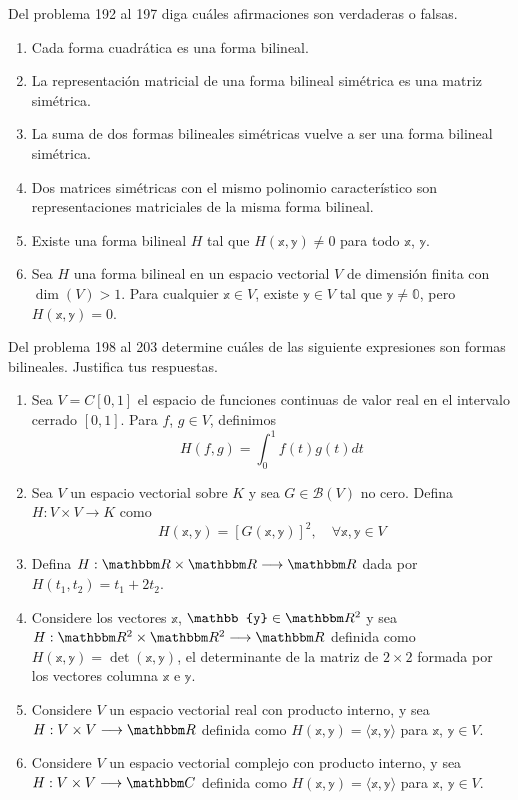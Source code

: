 Del problema 192 al 197 diga cuáles afirmaciones son verdaderas o falsas.
\begin{enumerate}[start=192]
    \item Cada forma cuadrática es una forma bilineal.
    \item La representación matricial de una forma bilineal simétrica es una matriz simétrica.
    \item La suma de dos formas bilineales simétricas vuelve a ser una forma bilineal simétrica.
    \item Dos matrices simétricas con el mismo polinomio característico son representaciones matriciales de la misma forma bilineal.
    \item Existe una forma bilineal $H$ tal que $H(\mathbb{x}, \mathbb{y}) \neq 0$ para todo $\mathbb{x}$, $\mathbb{y}$.
    \item Sea $H$ una forma bilineal en un espacio vectorial $V$ de dimensión finita con $\operatorname{dim}(V) > 1$. Para cualquier $\mathbb{x} \in V$, existe $\mathbb{y} \in V$ tal que $\mathbb{y} \neq \mathbb{0}$, pero $H(\mathbb{x}, \mathbb{y}) = 0$.
\end{enumerate}
Del problema 198 al 203 determine cuáles de las siguiente expresiones son formas bilineales. Justifica tus respuestas.
\begin{enumerate}[resume]
    \item Sea $V = C[0, 1]$ el espacio de funciones continuas de valor real en el intervalo cerrado $[0, 1]$. Para $f$, $g \in V$, definimos
    $$H(f, g) = \int_{0}^{1} f(t)g(t) dt$$
    \item Sea $V$ un espacio vectorial sobre $K$ y sea $G \in \mathcal{B}(V)$ no cero. Defina $H: V \times V \longrightarrow K$ como
    $$H(\mathbb{x}, \mathbb{y}) = [G(\mathbb{x}, \mathbb{y})]^2, \quad \forall \mathbb{x}, \mathbb{y} \in V$$
    \item Defina $H: \RR \times \RR \longrightarrow \RR$ dada por $H(t_1, t_2) = t_1 + 2t_2$.\newpage
    \item Considere los vectores $\mathbb{x}$, $\mathbb{y} \in \RR[2]$ y sea $H:\RR[2] \times \RR[2] \longrightarrow \RR$ definida como $H(\mathbb{x}, \mathbb{y}) = \operatorname{det}(\mathbb{x}, \mathbb{y})$, el determinante de la matriz de $2 \times 2$ formada por los vectores columna $\mathbb{x}$ e $\mathbb{y}$.
    \item Considere $V$ un espacio vectorial real con producto interno, y sea $H: V \times V \longrightarrow \RR$ definida como $H(\mathbb{x}, \mathbb{y}) = \langle \mathbb{x}, \mathbb{y} \rangle$ para $\mathbb{x}$, $\mathbb{y} \in V$.
    \item Considere $V$ un espacio vectorial complejo con producto interno, y sea $H: V \times V \longrightarrow \CC$ definida como $H(\mathbb{x}, \mathbb{y}) = \langle \mathbb{x}, \mathbb{y} \rangle$ para $\mathbb{x}$, $\mathbb{y} \in V$.
\end{enumerate}
